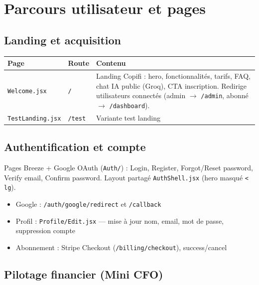 \documentclass[11pt,a4paper]{report}
\newcommand{\filepath}[1]{\texttt{\small #1}}
\begin{document}
\chapter{Parcours utilisateur et pages}

\section{Landing et acquisition}

\begin{longtable}{@{}p{3.2cm}p{2.8cm}p{8.5cm}@{}}
\toprule
\textbf{Page} & \textbf{Route} & \textbf{Contenu} \\
\midrule
\endhead
\filepath{Welcome.jsx} & \texttt{/} &
Landing Copifi : hero, fonctionnalités, tarifs, FAQ, chat IA public (Groq), CTA inscription.
Redirige utilisateurs connectés (admin $\rightarrow$ \texttt{/admin}, abonné $\rightarrow$ \texttt{/dashboard}). \\
\filepath{TestLanding.jsx} & \texttt{/test} & Variante test landing \\
\bottomrule
\end{longtable}

\section{Authentification et compte}

Pages Breeze + Google OAuth (\filepath{Auth/}) :
Login, Register, Forgot/Reset password, Verify email, Confirm password.
Layout partagé \filepath{AuthShell.jsx} (hero masqué \texttt{< lg}).

\begin{itemize}[leftmargin=1.5em]
    \item Google : \texttt{/auth/google/redirect} et \texttt{/callback}
    \item Profil : \filepath{Profile/Edit.jsx} — mise à jour nom, email, mot de passe, suppression compte
    \item Abonnement : Stripe Checkout (\texttt{/billing/checkout}), success/cancel
\end{itemize}

\section{Pilotage financier (Mini CFO)}
\end{document}
